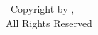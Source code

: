 
\mbox{}
\vfill
\begin{singlespace}
	\begin{center}
		\textcopyright\ Copyright by \ThesisAuthor, \ThesisYear\\
		All Rights Reserved
	\end{center}
\end{singlespace}
\vfill

\clearpage
